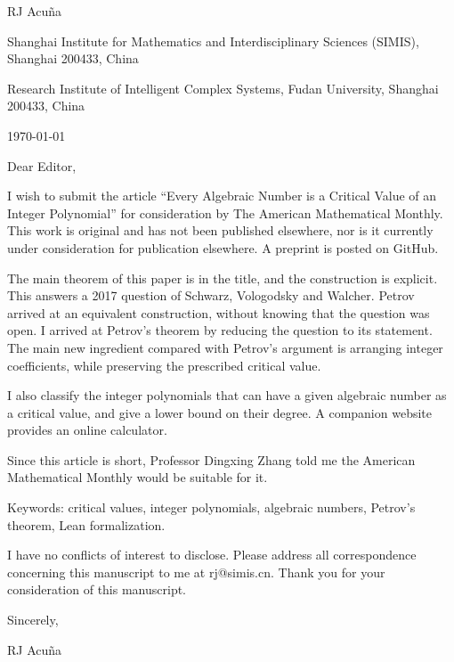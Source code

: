 \documentclass{letter}
\begin{document}
RJ Acu\~na

Shanghai Institute for Mathematics and Interdisciplinary Sciences (SIMIS),
Shanghai 200433, China

Research Institute of Intelligent Complex Systems, Fudan University,
Shanghai 200433, China

\vspace{1pc}

\today

\vspace{1pc}

Dear Editor,

\vspace{6pt}
I wish to submit the article ``Every Algebraic Number is a Critical Value of an
Integer Polynomial'' for consideration by The American Mathematical Monthly.
This work is original and has not been published elsewhere, nor is it currently
under consideration for publication elsewhere. A preprint is posted on GitHub.

\vspace{6pt}

The main theorem of this paper is in the title, and the construction is
explicit. This answers a 2017 question of Schwarz, Vologodsky and Walcher.
Petrov arrived at an equivalent construction, without knowing that the
question was open. I arrived at Petrov's theorem by reducing the question to
its statement. The main new ingredient compared with Petrov's argument is
arranging integer coefficients, while preserving the prescribed critical value.

\vspace{6pt}

I also classify the integer polynomials that can have a given algebraic number
as a critical value, and give a lower bound on their degree. A companion
website provides an online calculator.

\vspace{6pt}

Since this article is short, Professor Dingxing Zhang told me the American
Mathematical Monthly would be suitable for it.

\vspace{6pt}

Keywords: critical values, integer polynomials, algebraic numbers, Petrov's
theorem, Lean formalization.

\vspace{6pt}

I have no conflicts of interest to disclose. Please address all correspondence
concerning this manuscript to me at rj@simis.cn. Thank you for your
consideration of this manuscript.

\vspace{6pt}

Sincerely,

\vspace{6pt}

RJ Acu\~na
\end{document}
